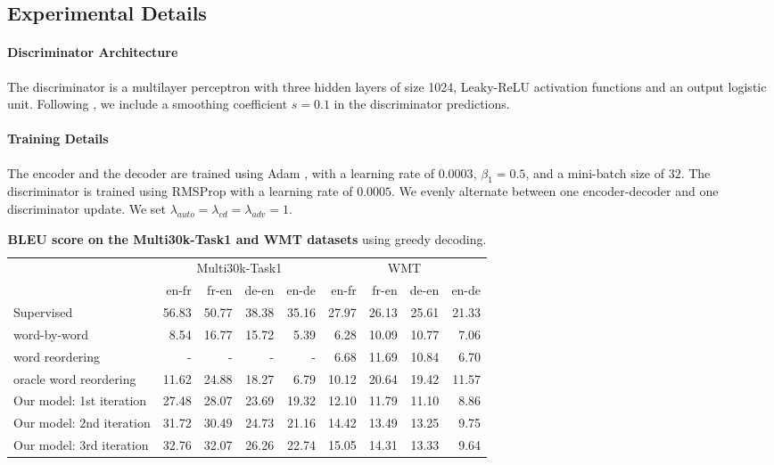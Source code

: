 \subsection{Experimental Details}

\paragraph{Discriminator Architecture} The discriminator is a multilayer perceptron with three hidden layers of size 1024, Leaky-ReLU activation functions and an output logistic unit. Following \cite{goodfellow2016nips}, we include a smoothing coefficient $s=0.1$ in the discriminator predictions. 

\paragraph{Training Details} The encoder and the decoder are trained using Adam \citep{kingma2014adam}, with a learning rate of $0.0003$, $\beta_1 = 0.5$, and a mini-batch size of $32$. The discriminator is trained using RMSProp \citep{Tieleman2012} with a learning rate of $0.0005$. We evenly alternate  between one encoder-decoder and one discriminator update. We set $\lambda_{auto} = \lambda_{cd} = \lambda_{adv} = 1$.

\begin{table*}[t]
	\begin{center}
	\small
	\begin{tabular}[b]{lrrrr|rrrr}
	\toprule
    & \multicolumn{4}{c}{Multi30k-Task1} & \multicolumn{4}{c}{WMT}\\
    & en-fr & fr-en & de-en & en-de & en-fr & fr-en & de-en & en-de \\
    \midrule

    Supervised & 56.83 & 50.77 & 38.38 & 35.16 & 27.97 & 26.13 & 25.61 & 21.33 \\
    \midrule
	word-by-word                      &  8.54 & 16.77 & 15.72 &  5.39 &  6.28 & 10.09 & 10.77 &  7.06 \\
	word reordering      &   -   &   -   &   -   &   -   &   6.68 & 11.69  & 10.84  &  6.70  \\
	oracle word reordering  & 11.62  & 24.88  & 18.27  &  6.79  & 10.12  & 20.64  & 19.42  & 11.57  \\
	\midrule
    Our model: 1st iteration                      & 27.48 & 28.07 & 23.69 & 19.32 & 12.10 & 11.79 & 11.10 &  8.86 \\
    Our model: 2nd iteration                      & 31.72 & 30.49 & 24.73 & 21.16 & 14.42 & 13.49 & 13.25 &  9.75 \\
    Our model: 3rd iteration                      & 32.76 & 32.07 & 26.26 & 22.74 & 15.05 & 14.31 & 13.33 &  9.64 \\
    \bottomrule
	\end{tabular}
	\caption{\textbf{BLEU score on the Multi30k-Task1 and WMT datasets} using greedy decoding.}
	\label{tab:bleu_performance}
	\end{center}
\end{table*}


